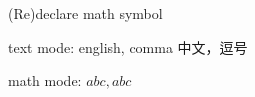 \documentclass{ctexart}
\begin{document}
\setcounter{tcb@cnt@example}{2}
\begin{example}{(Re)declare math symbol}

\LARGE
text mode: english, comma 中文，逗号\par
math mode: $abc, abc$
\end{example}
\end{document}
